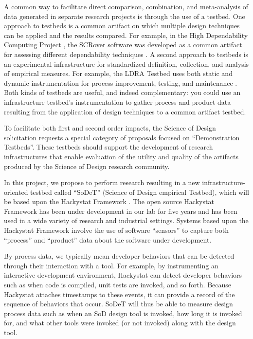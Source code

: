 A common way to facilitate direct comparison, combination, and
meta-analysis of data generated in separate research projects is through
the use of a testbed.  One approach to testbeds is a common artifact on
which multiple design techniques can be applied and the results compared.
For example, in the High Dependability Computing Project \cite{Boehm04},
the SCRover software was developed as a common artifact for assessing
different dependability techniques \cite{Boehm04b}. A second approach to
testbeds is an experimental infrastructure for standardized definition,
collection, and analysis of empirical measures. For example, the LDRA
Testbed uses both static and dynamic instrumentation for process
improvement, testing, and maintenance \cite{Hennel06}.  Both kinds of
testbeds are useful, and indeed complementary: you could use an
infrastructure testbed's instrumentation to gather process and product data
resulting from the application of design techniques to a common artifact
testbed.

To facilitate both first and second order impacts, the Science of
Design solicitation requests a special category of proposals focused on
``Demonstration Testbeds''.  These testbeds should support the development
of research infrastructures that enable evaluation of the utility and
quality of the artifacts produced by the Science of Design research
community.

In this project, we propose to perform research resulting in a new
infrastructure-oriented testbed called ``SoDeT'' (Science of Design
empirical Testbed), which will be based upon the Hackystat Framework
\cite{Hackystat}.  The open source Hackystat Framework has been under
development in our lab for five years and has been used in a wide variety
of research and industrial settings. Systems based upon the Hackystat
Framework involve the use of software ``sensors'' to capture both
``process'' and ``product'' data about the software under development.

By process data, we typically mean developer behaviors that can be detected
through their interaction with a tool.  For example, by instrumenting an
interactive development environment, Hackystat can detect developer
behaviors such as when code is compiled, unit tests are invoked, and so
forth.  Because Hackystat attaches timestamps to these events, it can
provide a record of the sequence of behaviors that occur.  SoDeT
will thus be able to measure design process data such as when an SoD
design tool is invoked, how long it is invoked for, and what other tools
were invoked (or not invoked) along with the design tool. 

